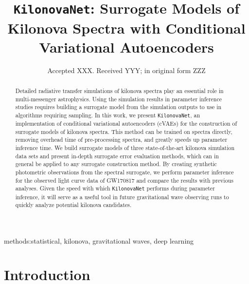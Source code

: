 \documentclass[fleqn,usenatbib,useAMS]{mnras}
\begin{document}
\title[KilonovaNet]{\texttt{KilonovaNet}: Surrogate Models of Kilonova Spectra with Conditional Variational Autoencoders}



\date{Accepted XXX. Received YYY; in original form ZZZ}

\maketitle

\begin{abstract}
Detailed radiative transfer simulations of kilonova spectra play an essential role in multi-messenger astrophysics. 
Using the simulation results in parameter inference studies requires building a surrogate model from the simulation outputs to use in algorithms requiring sampling. 
In this work, we present \texttt{KilonovaNet}, an implementation of conditional variational autoencoders (cVAEs) for the construction of surrogate models of kilonova spectra.
This method can be trained on spectra directly, removing overhead time of pre-processing spectra, and greatly speeds up parameter inference time.
We build surrogate models of three state-of-the-art kilonova simulation data sets and present in-depth surrogate error evaluation methods, which can in general be applied to any surrogate construction method. 
By creating synthetic photometric observations from the spectral surrogate, we perform parameter inference for the observed light curve data of GW170817 and compare the results with previous analyses.
Given the speed with which \texttt{KilonovaNet} performs during parameter inference, it will serve as a useful tool in future gravitational wave observing runs to quickly analyze potential kilonova candidates. 


\end{abstract}

\begin{keywords}
methods:statistical,
kilonova,
gravitational waves,
deep learning
\end{keywords}
\section{Introduction}
\end{document}
